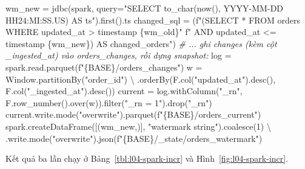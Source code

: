 \documentclass[
  12pt,
  a4paper,
]{article}
\newenvironment{Shaded}{}{}
\newcommand{\BuiltInTok}[1]{\textcolor[rgb]{0.00,0.50,0.00}{#1}}
\newcommand{\CommentTok}[1]{\textcolor[rgb]{0.38,0.63,0.69}{\textit{#1}}}
\newcommand{\DecValTok}[1]{\textcolor[rgb]{0.25,0.63,0.44}{#1}}
\newcommand{\NormalTok}[1]{#1}
\newcommand{\OperatorTok}[1]{\textcolor[rgb]{0.40,0.40,0.40}{#1}}
\newcommand{\SpecialCharTok}[1]{\textcolor[rgb]{0.25,0.44,0.63}{#1}}
\newcommand{\SpecialStringTok}[1]{\textcolor[rgb]{0.73,0.40,0.53}{#1}}
\newcommand{\StringTok}[1]{\textcolor[rgb]{0.25,0.44,0.63}{#1}}
\begin{document}
\begin{Shaded}
\begin{Highlighting}[]
\NormalTok{wm\_new }\OperatorTok{=}\NormalTok{ jdbc(spark, query}\OperatorTok{=}\StringTok{"SELECT to\_char(now(), \textquotesingle{}YYYY{-}MM{-}DD HH24:MI:SS.US\textquotesingle{}) AS ts"}\NormalTok{).first().ts}
\NormalTok{changed\_sql }\OperatorTok{=}\NormalTok{ (}\SpecialStringTok{f"(SELECT * FROM orders WHERE updated\_at \textgreater{} timestamp \textquotesingle{}}\SpecialCharTok{\{}\NormalTok{wm\_old}\SpecialCharTok{\}}\SpecialStringTok{\textquotesingle{}"}
               \SpecialStringTok{f" AND updated\_at \textless{}= timestamp \textquotesingle{}}\SpecialCharTok{\{}\NormalTok{wm\_new}\SpecialCharTok{\}}\SpecialStringTok{\textquotesingle{}) AS changed\_orders"}\NormalTok{)}
\CommentTok{\# ... ghi changes (kèm cột \_ingested\_at) vào orders\_changes, rồi dựng snapshot:}
\NormalTok{log }\OperatorTok{=}\NormalTok{ spark.read.parquet(}\SpecialStringTok{f"}\SpecialCharTok{\{}\NormalTok{BASE}\SpecialCharTok{\}}\SpecialStringTok{/orders\_changes"}\NormalTok{)}
\NormalTok{w }\OperatorTok{=}\NormalTok{ Window.partitionBy(}\StringTok{"order\_id"}\NormalTok{) }\OperatorTok{\textbackslash{}}
\NormalTok{    .orderBy(F.col(}\StringTok{"updated\_at"}\NormalTok{).desc(), F.col(}\StringTok{"\_ingested\_at"}\NormalTok{).desc())}
\NormalTok{current }\OperatorTok{=}\NormalTok{ log.withColumn(}\StringTok{"\_rn"}\NormalTok{, F.row\_number().over(w)).}\BuiltInTok{filter}\NormalTok{(}\StringTok{"\_rn = 1"}\NormalTok{).drop(}\StringTok{"\_rn"}\NormalTok{)}
\NormalTok{current.write.mode(}\StringTok{"overwrite"}\NormalTok{).parquet(}\SpecialStringTok{f"}\SpecialCharTok{\{}\NormalTok{BASE}\SpecialCharTok{\}}\SpecialStringTok{/orders\_current"}\NormalTok{)}
\NormalTok{spark.createDataFrame([(wm\_new,)], }\StringTok{"watermark string"}\NormalTok{).coalesce(}\DecValTok{1}\NormalTok{) }\OperatorTok{\textbackslash{}}
\NormalTok{    .write.mode(}\StringTok{"overwrite"}\NormalTok{).json(}\SpecialStringTok{f"}\SpecialCharTok{\{}\NormalTok{BASE}\SpecialCharTok{\}}\SpecialStringTok{/\_state/orders\_watermark"}\NormalTok{)}
\end{Highlighting}
\end{Shaded}

Kết quả ba lần chạy ở Bảng~\ref{tbl:l04-spark-incr} và
Hình~\ref{fig:l04-spark-incr}.
\end{document}
